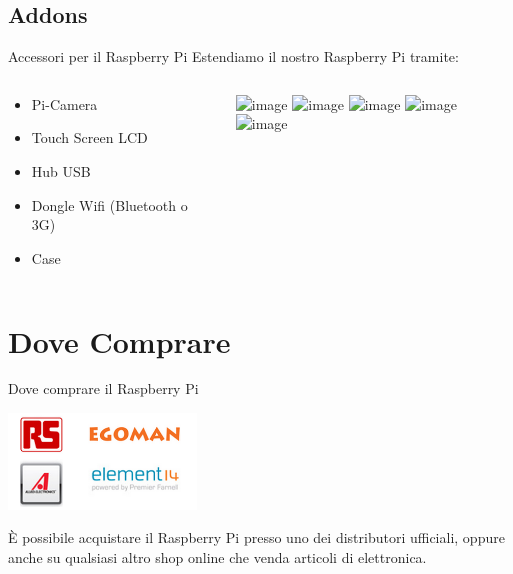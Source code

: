 \documentclass[xcolor=svgnames,11pt]{beamer}
\begin{document}
\subsection{Addons}
\begin{frame}[fragile]{Accessori per il Raspberry Pi}
Estendiamo il nostro Raspberry Pi tramite:
\vspace{1cm}

\begin{columns}
    \begin{column}{0.5\textwidth}
	\begin{itemize}
	\item Pi-Camera
	\pause
	\item Touch Screen LCD
	\pause
	\item Hub USB
	\pause
	\item Dongle Wifi (Bluetooth o 3G)
	\pause
	\item Case
	\end{itemize}
    \end{column}
    \begin{column}{0.5\textwidth}
    \begin{center}
      \includegraphics<1>[height=4cm]{picamera.png}
      \includegraphics<2>[height=4cm]{pimonitor.png}
      \includegraphics<3>[height=4cm]{pihub.png}
      \includegraphics<4>[height=4cm]{piwifi.png}
      \includegraphics<5>[height=4cm]{picase.png}            
    \end{center}
    \end{column}
  \end{columns}
\end{frame}

\section{Dove Comprare}

\begin{frame}{Dove comprare il Raspberry Pi}

\begin{center}
\includegraphics[width=5cm]{wherebuy.png}
\end{center}

\`E possibile acquistare il Raspberry Pi presso uno dei distributori ufficiali, oppure anche su qualsiasi altro shop online che venda articoli di elettronica.
\end{frame}
\end{document}
